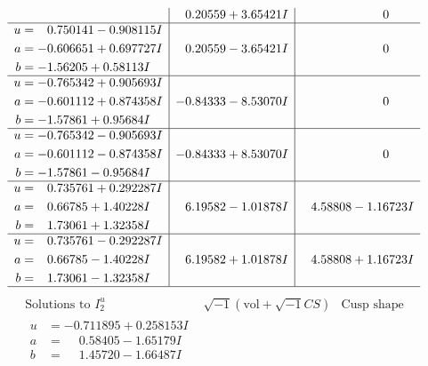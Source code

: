 \documentclass[1p]{elsarticle_modified}
\theoremstyle{definition}
\newcommand{\I}{\sqrt{-1}}
\begin{document}
$$\begin{array}{c|c|c}
 & \phantom{-}0.20559 + 3.65421 I & \phantom{-0.000000 } 0 \\ \hline\begin{aligned}
u &= \phantom{-}0.750141 - 0.908115 I \\
a &= -0.606651 + 0.697727 I \\
b &= -1.56205 + 0.58113 I\end{aligned}
 & \phantom{-}0.20559 - 3.65421 I & \phantom{-0.000000 } 0 \\ \hline\begin{aligned}
u &= -0.765342 + 0.905693 I \\
a &= -0.601112 + 0.874358 I \\
b &= -1.57861 + 0.95684 I\end{aligned}
 & -0.84333 - 8.53070 I & \phantom{-0.000000 } 0 \\ \hline\begin{aligned}
u &= -0.765342 - 0.905693 I \\
a &= -0.601112 - 0.874358 I \\
b &= -1.57861 - 0.95684 I\end{aligned}
 & -0.84333 + 8.53070 I & \phantom{-0.000000 } 0 \\ \hline\begin{aligned}
u &= \phantom{-}0.735761 + 0.292287 I \\
a &= \phantom{-}0.66785 + 1.40228 I \\
b &= \phantom{-}1.73061 + 1.32358 I\end{aligned}
 & \phantom{-}6.19582 - 1.01878 I & \phantom{-}4.58808 - 1.16723 I \\ \hline\begin{aligned}
u &= \phantom{-}0.735761 - 0.292287 I \\
a &= \phantom{-}0.66785 - 1.40228 I \\
b &= \phantom{-}1.73061 - 1.32358 I\end{aligned}
 & \phantom{-}6.19582 + 1.01878 I & \phantom{-}4.58808 + 1.16723 I\\
 \hline 
 \end{array}$$\newpage$$\begin{array}{c|c|c}  
\text{Solutions to }I^u_{2}& \I (\text{vol} + \sqrt{-1}CS) & \text{Cusp shape}\\
 \hline 
\begin{aligned}
u &= -0.711895 + 0.258153 I \\
a &= \phantom{-}0.58405 - 1.65179 I \\
b &= \phantom{-}1.45720 - 1.66487 I\end{aligned}

\end{array}$$
\end{document}
